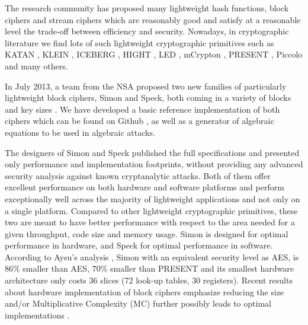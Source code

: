 The research community has
proposed many lightweight hash functions, block ciphers and stream ciphers which are
reasonably good and satisfy at a reasonable level the trade-off
between efficiency and security. Nowadays, in cryptographic
literature we find lots of such lightweight cryptographic primitives such as
KATAN \cite{KATAN}, KLEIN \cite{KLEIN}, ICEBERG
\cite{ICEBERG}, HIGHT \cite{HIGHT}, LED \cite{LED},
mCrypton \cite{mCrypton}, PRESENT \cite{PRESENT}, Piccolo \cite{Piccolo}
and many others.

In July 2013, a team from the NSA proposed two new families of particularly lightweight block
ciphers, Simon and Speck, both coming in a variety of blocks and key sizes
\cite{NSAciphers}. We have developed a basic reference implementation of both ciphers 
which can be found on Github \cite{simonref},
as well as a generator of algebraic equations to be used in algebraic attacks. 

The designers of Simon and Speck published the full specifications and presented
only performance and implementation footprints, without providing
any advanced security analysis
against known cryptanalytic attacks.
Both of them offer excellent performance on both
hardware and software platforms and perform
exceptionally well across the majority of lightweight applications and
not only on a single platform. Compared to
other lightweight cryptographic primitives,
these two are meant to have better performance with respect to the area
needed for a given throughput, code size and memory usage.
Simon is designed for optimal performance in hardware, and Speck for optimal
performance in software.
According to Aysu's analysis \cite{simoneff}, Simon with an equivalent security level as AES,
is $86\%$ smaller
than AES, $70\%$ smaller than PRESENT and its smallest hardware architecture
only costs 36 slices (72 look-up tables, 30 registers). Recent results about hardware
implementation of block ciphers emphasize reducing the size and/or Multiplicative Complexity (MC) further possibly
leads to optimal implementations \cite{BoyarPeraltaMCMethodAES,OptimiPaper}.

